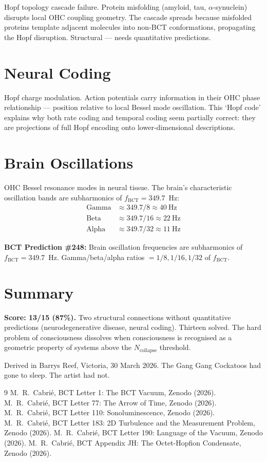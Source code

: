 \documentclass[aps,prl,twocolumn,superscriptaddress]{revtex4-2}
\begin{document}
Hopf topology cascade failure. Protein misfolding (amyloid, tau, $\alpha$-synuclein) disrupts local OHC coupling geometry. The cascade spreads because misfolded proteins template adjacent molecules into non-BCT conformations, propagating the Hopf disruption. Structural --- needs quantitative predictions.

\section{Neural Coding}

Hopf charge modulation. Action potentials carry information in their OHC phase relationship --- position relative to local Bessel mode oscillation. This `Hopf code' explains why both rate coding and temporal coding seem partially correct: they are projections of full Hopf encoding onto lower-dimensional descriptions.

\section{Brain Oscillations}

OHC Bessel resonance modes in neural tissue. The brain's characteristic oscillation bands are subharmonics of $f_{\mathrm{BCT}} = 349.7$~Hz:
\begin{align}
\text{Gamma} &\approx 349.7/8 \approx 40~\text{Hz} \\
\text{Beta} &\approx 349.7/16 \approx 22~\text{Hz} \\
\text{Alpha} &\approx 349.7/32 \approx 11~\text{Hz}
\end{align}

\textbf{BCT Prediction \#248:} Brain oscillation frequencies are subharmonics of $f_{\mathrm{BCT}} = 349.7$~Hz. Gamma/beta/alpha ratios $= 1/8, 1/16, 1/32$ of $f_{\mathrm{BCT}}$.

\section{Summary}

\textbf{Score: 13/15 (87\%).} Two structural connections without quantitative predictions (neurodegenerative disease, neural coding). Thirteen solved. The hard problem of consciousness dissolves when consciousness is recognised as a geometric property of systems above the $N_{\mathrm{collapse}}$ threshold.

\begin{acknowledgments}
Derived in Barrys Reef, Victoria, 30 March 2026. The Gang Gang Cockatoos had gone to sleep. The artist had not.
\end{acknowledgments}

\begin{thebibliography}{9}
 M.~R.~Cabri\'e, BCT Letter 1: The BCT Vacuum, Zenodo (2026).
 M.~R.~Cabri\'e, BCT Letter 77: The Arrow of Time, Zenodo (2026).
 M.~R.~Cabri\'e, BCT Letter 110: Sonoluminescence, Zenodo (2026).
 M.~R.~Cabri\'e, BCT Letter 183: 2D Turbulence and the Measurement Problem, Zenodo (2026).
 M.~R.~Cabri\'e, BCT Letter 190: Language of the Vacuum, Zenodo (2026).
 M.~R.~Cabri\'e, BCT Appendix JH: The Octet-Hopfion Condensate, Zenodo (2026).
\end{thebibliography}
\end{document}
